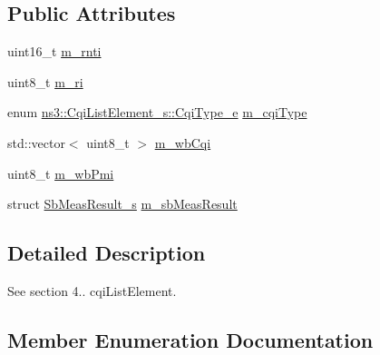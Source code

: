 \subsection*{Public Attributes}
\begin{DoxyCompactItemize}
\item 
uint16\+\_\+t \hyperlink{structns3_1_1CqiListElement__s_ad89fb6c5819526727ae5c8d8e9a7b0df}{m\+\_\+rnti}
\item 
uint8\+\_\+t \hyperlink{structns3_1_1CqiListElement__s_a3d65e518db069c6f1b269636ebb70d70}{m\+\_\+ri}
\item 
enum \hyperlink{structns3_1_1CqiListElement__s_a8f1bd827fd9842e7c07e39265d88299a}{ns3\+::\+Cqi\+List\+Element\+\_\+s\+::\+Cqi\+Type\+\_\+e} \hyperlink{structns3_1_1CqiListElement__s_af9ca26ac77ff72e49d841e7bcc5034b5}{m\+\_\+cqi\+Type}
\item 
std\+::vector$<$ uint8\+\_\+t $>$ \hyperlink{structns3_1_1CqiListElement__s_a0f6ddce8f9219b61f754ae85f8a57c57}{m\+\_\+wb\+Cqi}
\item 
uint8\+\_\+t \hyperlink{structns3_1_1CqiListElement__s_ab37f381bf266975d5d0d3c8d4c288f6d}{m\+\_\+wb\+Pmi}
\item 
struct \hyperlink{structns3_1_1SbMeasResult__s}{Sb\+Meas\+Result\+\_\+s} \hyperlink{structns3_1_1CqiListElement__s_a40db809ad4749427bdd559413cce5203}{m\+\_\+sb\+Meas\+Result}
\end{DoxyCompactItemize}


\subsection{Detailed Description}
See section 4.. cqi\+List\+Element. 

\subsection{Member Enumeration Documentation}
